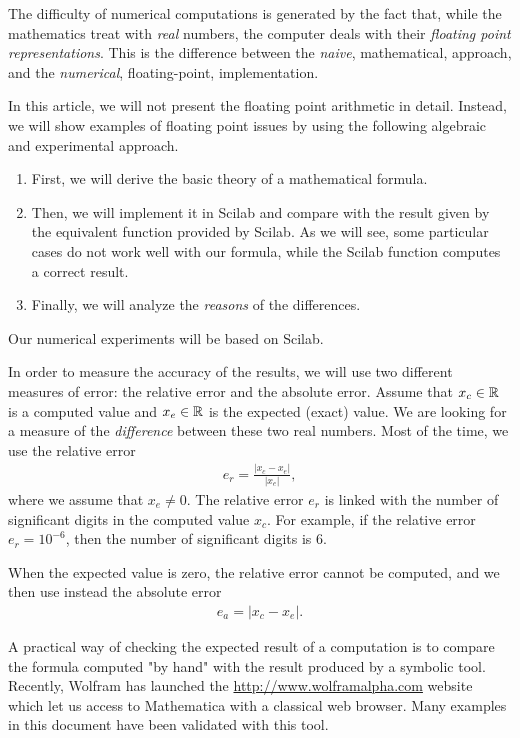 The difficulty of numerical computations is generated by the fact that, while 
the mathematics treat with \emph{real} numbers, the 
computer deals with their \emph{floating point representations}.
This is the difference between the 
\emph{naive}, mathematical, approach, and the \emph{numerical},
floating-point, implementation.

In this article, we will not present the floating point arithmetic in 
detail. Instead, we will show examples of floating point issues by 
using the following algebraic and experimental approach.
\begin{enumerate}
\item First, we will derive the basic theory of a mathematical formula. 
\item Then, we will implement it in Scilab and compare with the 
result given by the equivalent function provided by Scilab.
As we will see, some particular cases do not work well
with our formula, while the Scilab function computes a correct
result.
\item Finally, we will analyze the \emph{reasons} of the differences.
\end{enumerate}
Our numerical experiments will be based on Scilab.

In order to measure the accuracy of the results, we will use 
two different measures of error: the relative error and the 
absolute error\cite{Higham:2002:ASN}. 
Assume that $x_c\in\mathbb{R}$ is a computed value and 
$x_e\in\mathbb{R}$ is the expected (exact) value. We are looking for 
a measure of the \emph{difference} between these two real numbers. 
Most of the time, we use the relative error 
\begin{eqnarray}
e_r=\frac{|x_c-x_e|}{|x_e|},
\end{eqnarray}
where we assume that $x_e\neq 0$. The relative error $e_r$ is linked with the number of significant 
digits in the computed value $x_c$. For example, if the relative 
error $e_r=10^{-6}$, then the number of significant digits is 6.

When the expected value is zero, the relative error cannot 
be computed, and we then use instead the absolute error  
\begin{eqnarray}
e_a=|x_c-x_e|.
\end{eqnarray}

A practical way of checking the expected result of a computation
is to compare the formula computed "by hand" with the result 
produced by a symbolic tool. Recently, Wolfram has launched the 
\url{http://www.wolframalpha.com}
website which let us access to Mathematica with a classical web browser.
Many examples in this document have been validated with this tool.

